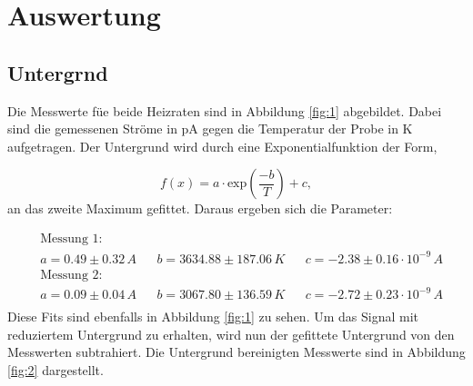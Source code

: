 \newpage
\section{Auswertung}
\label{sec:Auswertung}

\subsection{Untergrnd}
\label{sec:Untergrund}
Die Messwerte füe beide Heizraten sind in Abbildung \ref{fig:1} abgebildet. 
Dabei sind die gemessenen Ströme in pA gegen die Temperatur der Probe in K aufgetragen.
Der Untergrund wird durch eine Exponentialfunktion der Form,

\begin{equation}
    f(x) = a \cdot \text{exp} \left( \frac{-b}{T} \right) + c,
\end{equation}
an das zweite Maximum gefittet.
Daraus ergeben sich die Parameter: 

\begin{align*}
    &\text{Messung 1:}\\
    & a = 0.49 \pm 0.32 \,A    &&  b = 3634.88 \pm 187.06 \,K    &&  c = -2.38 \pm 0.16 \cdot 10^{-9}\,A \\
    &\text{Messung 2:}\\
    & a = 0.09 \pm 0.04 \,A    &&  b = 3067.80 \pm 136.59 \,K    &&  c = -2.72 \pm 0.23 \cdot 10^{-9}\,A \\
\end{align*}
Diese Fits sind ebenfalls in Abbildung \ref{fig:1} zu sehen.
Um das Signal mit reduziertem Untergrund zu erhalten, wird nun der gefittete Untergrund von den Messwerten subtrahiert.
Die Untergrund bereinigten Messwerte sind in Abbildung \ref{fig:2} dargestellt.


